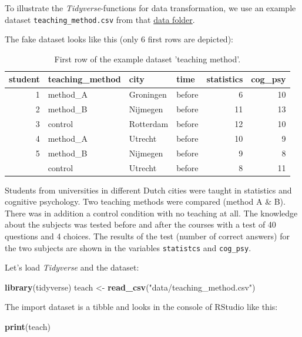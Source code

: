 \documentclass[
]{scrartcl}
\newenvironment{Shaded}{\begin{snugshade}}{\end{snugshade}}
\newcommand{\KeywordTok}[1]{\textcolor[rgb]{0.13,0.29,0.53}{\textbf{#1}}}
\newcommand{\NormalTok}[1]{#1}
\newcommand{\StringTok}[1]{\textcolor[rgb]{0.31,0.60,0.02}{#1}}
\begin{document}
To illustrate the \emph{Tidyverse}-functions for data transformation, we use an example dataset \texttt{teaching\_method.csv} from that \href{./data}{data folder}.

The fake dataset looks like this (only 6 first rows are depicted):

\begin{table}

\caption{\label{tab:unnamed-chunk-148}First row of the example dataset 'teaching method'.}
\centering
\begin{tabular}[t]{rlllrr}
\toprule
student & teaching\_method & city & time & statistics & cog\_psy\\
\midrule
1 & method\_A & Groningen & before & 6 & 10\\
2 & method\_B & Nijmegen & before & 11 & 13\\
3 & control & Rotterdam & before & 12 & 10\\
4 & method\_A & Utrecht & before & 10 & 9\\
5 & method\_B & Nijmegen & before & 9 & 8\\
\addlinespace
6 & control & Utrecht & before & 8 & 11\\
\bottomrule
\end{tabular}
\end{table}

Students from universities in different Dutch cities were taught in statistics and cognitive psychology. Two teaching methods were compared (method A \& B). There was in addition a control condition with no teaching at all. The knowledge about the subjects was tested before and after the courses with a test of 40 questions and 4 choices. The results of the test (number of correct answers) for the two subjects are shown in the variables \texttt{statistcs} and \texttt{cog\_psy}.

Let's load \emph{Tidyverse} and the dataset:

\begin{Shaded}
\begin{Highlighting}[]
\KeywordTok{library}\NormalTok{(tidyverse)}
\NormalTok{teach \textless{}{-}}\StringTok{ }\KeywordTok{read\_csv}\NormalTok{(}\StringTok{"data/teaching\_method.csv"}\NormalTok{)}
\end{Highlighting}
\end{Shaded}

The import dataset is a tibble and looks in the console of RStudio like this:

\begin{Shaded}
\begin{Highlighting}[]
\KeywordTok{print}\NormalTok{(teach)}
\end{Highlighting}
\end{Shaded}
\end{document}
